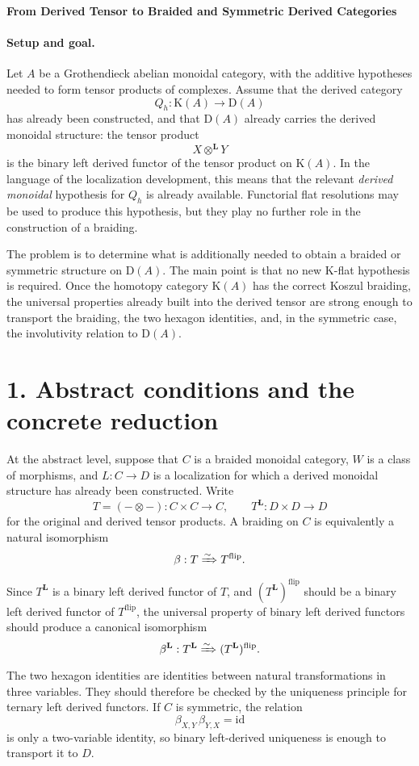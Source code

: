 \documentclass[10pt,a4paper]{article}
\newcommand{\K}{\mathrm K(A)}
\newcommand{\D}{\mathrm D(A)}
\newcommand{\Ltensor}{\otimes^{\mathbf L}}
\begin{document}
\begin{center}
{\Large\bfseries From Derived Tensor to Braided and Symmetric Derived Categories}
\end{center}
\vspace{0.2em}

\paragraph{Setup and goal.}
Let $A$ be a Grothendieck abelian monoidal category, with the additive hypotheses needed to form tensor products of complexes. Assume that the derived category
\[
  Q_h : \K \longrightarrow \D
\]
has already been constructed, and that $\D$ already carries the derived monoidal structure: the tensor product
\[
  X \Ltensor Y
\]
is the binary left derived functor of the tensor product on $\K$. In the language of the localization development, this means that the relevant \emph{derived monoidal} hypothesis for $Q_h$ is already available. Functorial flat resolutions may be used to produce this hypothesis, but they play no further role in the construction of a braiding.

The problem is to determine what is additionally needed to obtain a braided or symmetric structure on $\D$. The main point is that no new K-flat hypothesis is required. Once the homotopy category $\K$ has the correct Koszul braiding, the universal properties already built into the derived tensor are strong enough to transport the braiding, the two hexagon identities, and, in the symmetric case, the involutivity relation to $\D$.

\section*{1. Abstract conditions and the concrete reduction}

At the abstract level, suppose that $C$ is a braided monoidal category, $W$ is a class of morphisms, and $L:C\to D$ is a localization for which a derived monoidal structure has already been constructed. Write
\[
  T = (-\otimes-) : C\times C\to C,
  \qquad
  T^{\mathbf L}:D\times D\to D
\]
for the original and derived tensor products. A braiding on $C$ is equivalently a natural isomorphism
\[
  \beta:T\xRightarrow{\sim}T^{\mathrm{flip}}.
\]
Since $T^{\mathbf L}$ is a binary left derived functor of $T$, and $(T^{\mathbf L})^{\mathrm{flip}}$ should be a binary left derived functor of $T^{\mathrm{flip}}$, the universal property of binary left derived functors should produce a canonical isomorphism
\[
  \beta^{\mathbf L}:T^{\mathbf L}\xRightarrow{\sim}(T^{\mathbf L})^{\mathrm{flip}}.
\]
The two hexagon identities are identities between natural transformations in three variables. They should therefore be checked by the uniqueness principle for ternary left derived functors. If $C$ is symmetric, the relation
\[
  \beta_{X,Y}\,\beta_{Y,X}=\mathrm{id}
\]
is only a two-variable identity, so binary left-derived uniqueness is enough to transport it to $D$.
\end{document}
